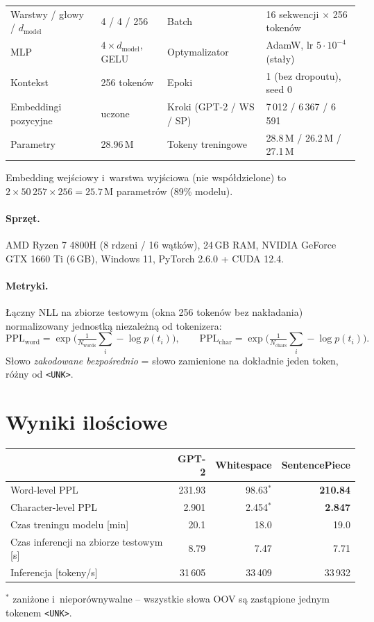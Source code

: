 \documentclass[11pt,a4paper]{article}
\begin{document}
\begin{center}\small
\begin{tabular}{@{}llll@{}}
\toprule
Warstwy / głowy / $d_\text{model}$ & 4 / 4 / 256 & Batch & 16 sekwencji $\times$ 256 tokenów \\
MLP & $4\times d_\text{model}$, GELU & Optymalizator & AdamW, lr $5\cdot 10^{-4}$ (stały) \\
Kontekst & 256 tokenów & Epoki & 1 (bez dropoutu), seed 0 \\
Embeddingi pozycyjne & uczone & Kroki (GPT-2 / WS / SP) & 7\,012 / 6\,367 / 6\,591 \\
Parametry & 28.96\,M & Tokeny treningowe & 28.8\,M / 26.2\,M / 27.1\,M \\
\bottomrule
\end{tabular}
\end{center}

Embedding wejściowy i~warstwa wyjściowa (nie współdzielone) to $2\times 50\,257\times 256 = 25.7$\,M parametrów (89\% modelu).

\paragraph{Sprzęt.} AMD Ryzen 7 4800H (8 rdzeni / 16 wątków), 24\,GB RAM, NVIDIA GeForce GTX 1660 Ti (6\,GB), Windows 11, PyTorch 2.6.0 + CUDA 12.4.

\paragraph{Metryki.} Łączny NLL na zbiorze testowym (okna 256 tokenów bez nakładania) normalizowany jednostką niezależną od tokenizera:
\[
\mathrm{PPL}_\text{word} = \exp\Big(\tfrac{1}{N_\text{words}}\sum_i -\log p(t_i)\Big), \qquad
\mathrm{PPL}_\text{char} = \exp\Big(\tfrac{1}{N_\text{chars}}\sum_i -\log p(t_i)\Big).
\]
Słowo \emph{zakodowane bezpośrednio} = słowo zamienione na dokładnie jeden token, różny od \texttt{<UNK>}.

\section{Wyniki ilościowe}

\begin{center}\small
\begin{tabular}{@{}lrrr@{}}
\toprule
 & GPT-2 & Whitespace & SentencePiece \\
\midrule
Word-level PPL & 231.93 & 98.63$^*$ & \textbf{210.84} \\
Character-level PPL & 2.901 & 2.454$^*$ & \textbf{2.847} \\
\midrule
Czas treningu modelu [min] & 20.1 & 18.0 & 19.0 \\
Czas inferencji na zbiorze testowym [s] & 8.79 & 7.47 & 7.71 \\
Inferencja [tokeny/s] & 31\,605 & 33\,409 & 33\,932 \\
\bottomrule
\end{tabular}

{\small $^*$ zaniżone i~nieporównywalne -- wszystkie słowa OOV są zastąpione jednym tokenem \texttt{<UNK>}.}
\end{center}
\end{document}

